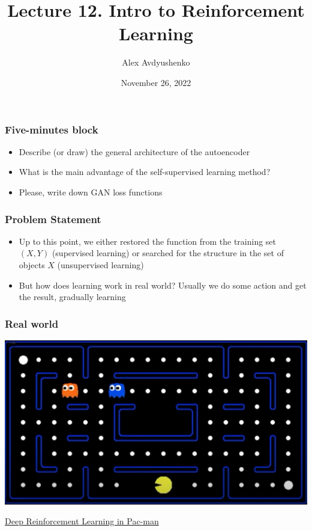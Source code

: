 \documentclass[fullscreen=true, bookmarks=true, hyperref={pdfencoding=unicode}]{beamer}
\title{Lecture 12. Intro to Reinforcement Learning}
\author{Alex Avdyushenko}
\institute{Kazakh-British Technical University}
\date{November 26, 2022}
\begin{document}

\begin{frame}
\transdissolve[duration=0.2]
\titlepage
\end{frame}


\begin{frame}
  \frametitle{Five-minutes block}
  \pause
  \begin{itemize}
    \item Describe (or draw) the general architecture of the autoencoder
    \item What is the main advantage of the self-supervised learning method?
    \item Please, write down GAN loss functions
  \end{itemize}
\end{frame}


\begin{frame}
  \frametitle{Problem Statement}

  \begin{itemize}
    \item Up to this point, we either restored the function from the training set $(X, Y)$ (supervised learning) or searched for the structure in the set of objects $X$ (unsupervised learning)
    \pause
    \item But how does learning work in real world? Usually we do some action and get the result, gradually learning
  \end{itemize}
\end{frame}


\begin{frame}
  \frametitle{Real world}

  \begin{center}
    \includegraphics[keepaspectratio,
                     width=.8\paperwidth]{pacman.png}

                     \href{https://www.youtube.com/watch?v=QilHGSYbjDQ}{Deep Reinforcement Learning in Pac-man}
  \end{center}
\end{frame}
\end{document}
